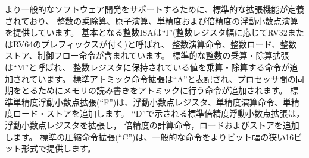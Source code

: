 \begin{comment}
To support more general software development, a set of standard
extensions are defined to provide integer multiply/divide, atomic
operations, and single and double-precision floating-point arithmetic.
The base integer ISA is named ``I'' (prefixed by RV32 or RV64
depending on integer register width), and contains integer
computational instructions, integer loads, integer stores, and
control-flow instructions.  The standard integer multiplication and
division extension is named ``M'', and adds instructions to multiply
and divide values held in the integer registers.  The standard atomic
instruction extension, denoted by ``A'', adds instructions that
atomically read, modify, and write memory for inter-processor
synchronization.  The standard single-precision floating-point
extension, denoted by ``F'', adds floating-point registers,
single-precision computational instructions, and single-precision
loads and stores.  The standard double-precision floating-point
extension, denoted by ``D'', expands the floating-point registers, and
adds double-precision computational instructions, loads, and stores.
The standard ``C'' compressed instruction extension
provides narrower 16-bit forms of common instructions.
\end{comment}

より一般的なソフトウェア開発をサポートするために、標準的な拡張機能が定義されており、
整数の乗除算、原子演算、単精度および倍精度の浮動小数点演算を提供しています。
基本となる整数ISAは``I''(整数レジスタ幅に応じてRV32またはRV64のプレフィックスが付く)と呼ばれ、
整数演算命令、整数ロード、整数ストア、制御フロー命令が含まれています。
標準的な整数の乗算・除算拡張は``M''と呼ばれ、
整数レジスタに保持されている値を乗算・除算する命令が追加されています。
標準アトミック命令拡張は``A''と表記され、プロセッサ間の同期をとるためにメモリの読み書きをアトミックに行う命令が追加されます。
標準単精度浮動小数点拡張(``F'')は、浮動小数点レジスタ、単精度演算命令、単精度ロード・ストアを追加します。
``D''で示される標準倍精度浮動小数点拡張は，浮動小数点レジスタを拡張し，
倍精度の計算命令，ロードおよびストアを追加します。
標準の圧縮命令拡張(``C'')は、一般的な命令をよりビット幅の狭い16ビット形式で提供します。

\begin{comment}
Beyond the base integer ISA and the standard GC extensions, we believe
it is rare that a new instruction will provide a significant benefit
for all applications, although it may be very beneficial for a certain
domain.  As energy efficiency concerns are forcing greater
specialization, we believe it is important to simplify the required
portion of an ISA specification.  Whereas other architectures usually
treat their ISA as a single entity, which changes to a new version as
instructions are added over time, RISC-V will endeavor to keep the
base and each standard extension constant over time, and instead layer
new instructions as further optional extensions.  For example, the
base integer ISAs will continue as fully supported standalone ISAs,
regardless of any subsequent extensions.
\end{comment}

